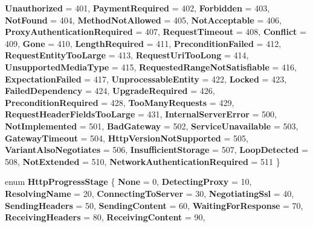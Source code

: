\begin{DoxyCompactItemize}
{\bfseries Unauthorized} = 401, 
\newline
{\bfseries Payment\+Required} = 402, 
{\bfseries Forbidden} = 403, 
{\bfseries Not\+Found} = 404, 
{\bfseries Method\+Not\+Allowed} = 405, 
\newline
{\bfseries Not\+Acceptable} = 406, 
{\bfseries Proxy\+Authentication\+Required} = 407, 
{\bfseries Request\+Timeout} = 408, 
{\bfseries Conflict} = 409, 
\newline
{\bfseries Gone} = 410, 
{\bfseries Length\+Required} = 411, 
{\bfseries Precondition\+Failed} = 412, 
{\bfseries Request\+Entity\+Too\+Large} = 413, 
\newline
{\bfseries Request\+Uri\+Too\+Long} = 414, 
{\bfseries Unsupported\+Media\+Type} = 415, 
{\bfseries Requested\+Range\+Not\+Satisfiable} = 416, 
{\bfseries Expectation\+Failed} = 417, 
\newline
{\bfseries Unprocessable\+Entity} = 422, 
{\bfseries Locked} = 423, 
{\bfseries Failed\+Dependency} = 424, 
{\bfseries Upgrade\+Required} = 426, 
\newline
{\bfseries Precondition\+Required} = 428, 
{\bfseries Too\+Many\+Requests} = 429, 
{\bfseries Request\+Header\+Fields\+Too\+Large} = 431, 
{\bfseries Internal\+Server\+Error} = 500, 
\newline
{\bfseries Not\+Implemented} = 501, 
{\bfseries Bad\+Gateway} = 502, 
{\bfseries Service\+Unavailable} = 503, 
{\bfseries Gateway\+Timeout} = 504, 
\newline
{\bfseries Http\+Version\+Not\+Supported} = 505, 
{\bfseries Variant\+Also\+Negotiates} = 506, 
{\bfseries Insufficient\+Storage} = 507, 
{\bfseries Loop\+Detected} = 508, 
\newline
{\bfseries Not\+Extended} = 510, 
{\bfseries Network\+Authentication\+Required} = 511
 \}
\item 
\mbox{\label{namespace_windows_1_1_web_1_1_http_aa0f55350f3367ec69564a41407e44b3b}} 
enum {\bfseries Http\+Progress\+Stage} \{ \newline
{\bfseries None} = 0, 
{\bfseries Detecting\+Proxy} = 10, 
{\bfseries Resolving\+Name} = 20, 
{\bfseries Connecting\+To\+Server} = 30, 
\newline
{\bfseries Negotiating\+Ssl} = 40, 
{\bfseries Sending\+Headers} = 50, 
{\bfseries Sending\+Content} = 60, 
{\bfseries Waiting\+For\+Response} = 70, 
\newline
{\bfseries Receiving\+Headers} = 80, 
{\bfseries Receiving\+Content} = 90, 

\end{DoxyCompactItemize}
